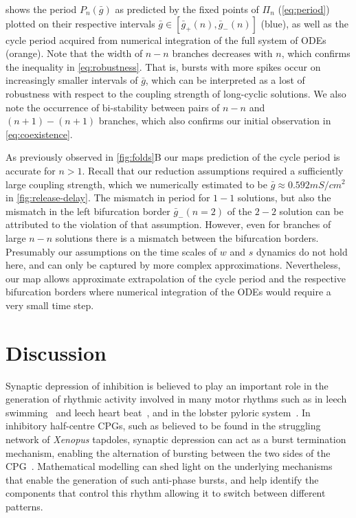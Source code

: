 \documentclass[utf8,draft]{frontiersFPHY} %
\newcommand{\gbar}{\bar g}
\begin{document}
 shows the period $P_n(\gbar)$ as predicted by the fixed points of $\Pi_n$ (\cref{eq:period}) plotted on their respective intervals $\gbar \in [\gbar_+(n),\gbar_-(n)]$ (blue), as well as the cycle period acquired from numerical integration of the full system of ODEs (orange).
Note that the width of $n-n$ branches decreases with $n$, which confirms the inequality in \cref{eq:robustness}.
That is, bursts with more spikes occur on increasingly smaller intervals of $\gbar$, which can be interpreted as a lost of robustness with respect to the coupling strength of long-cyclic solutions.
We also note the occurrence of bi-stability between pairs of $n-n$ and $(n+1)-(n+1)$ branches, which also confirms our initial observation in \cref{eq:coexistence}.

As previously observed in \cref{fig:folds}B our maps prediction of the cycle period is accurate for $n>1$.
Recall that our reduction assumptions required a sufficiently large coupling strength, which we numerically estimated to be $\gbar \approx 0.592\si{mS/cm^2}$ in \cref{fig:release-delay}.
The mismatch in period for $1-1$ solutions, but also the mismatch in the left bifurcation border $\gbar_-(n=2)$ of the $2-2$ solution can be attributed to the violation of that assumption.
However, even for branches of large $n-n$ solutions there is a mismatch between the bifurcation borders.
Presumably our assumptions on the time scales of $w$ and $s$ dynamics do not hold here, and can only be captured by more complex approximations.
Nevertheless, our map allows approximate extrapolation of the cycle period and the respective bifurcation borders where numerical integration of the ODEs would require a very small time step.

\section{Discussion}
Synaptic depression of inhibition is believed to play an important role in the generation of rhythmic activity involved in many motor rhythms such as in leech swimming~\citep{mangan1994} and leech heart beat~\citep{calabrese1995}, and in the lobster pyloric system~\citep{manor1997, rabbah2007}.
In inhibitory half-centre CPGs, such as believed to be found in the struggling network of \textit{Xenopus} tapdoles,  synaptic depression can act as a burst termination mechanism, enabling the alternation of bursting between the two sides of the CPG~\citep{li2007}.
Mathematical modelling can shed light on the underlying mechanisms that enable the generation of such anti-phase bursts, and help identify the components that control this rhythm allowing it to switch between different patterns.
\end{document}
